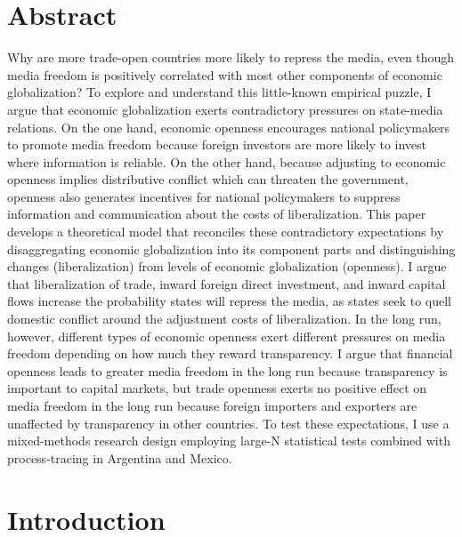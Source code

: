 \documentclass[12pt]{report}
\begin{document}
\section{Abstract}

Why are more trade-open countries more likely to repress the media, even though media freedom is
positively correlated with most other components of economic globalization? To explore and
understand this little-known empirical puzzle, I argue that economic globalization exerts
contradictory pressures on state-media relations. On the one hand, economic openness encourages
national policymakers to promote media freedom because foreign investors are more likely to invest
where information is reliable. On the other hand, because adjusting to economic openness implies
distributive conflict which can threaten the government, openness also generates incentives for
national policymakers to suppress information and communication about the costs of liberalization.
This paper develops a theoretical model that reconciles these contradictory expectations by
disaggregating economic globalization into its component parts and distinguishing changes
(liberalization) from levels of economic globalization (openness). I argue that liberalization of
trade, inward foreign direct investment, and inward capital flows increase the probability states
will repress the media, as states seek to quell domestic conflict around the adjustment costs of
liberalization. In the long run, however, different types of economic openness exert different
pressures on media freedom depending on how much they reward transparency. I argue that financial
openness leads to greater media freedom in the long run because transparency is important to capital
markets, but trade openness exerts no positive effect on media freedom in the long run because
foreign importers and exporters are unaffected by transparency in other countries. To test these
expectations, I use a mixed-methods research design employing large-N statistical tests combined
with process-tracing in Argentina and Mexico.

\section{Introduction}
\end{document}
